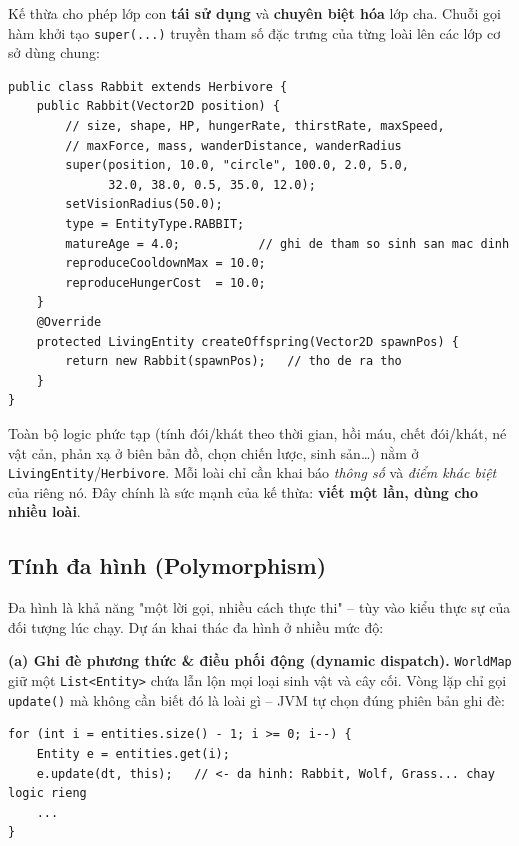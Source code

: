 \documentclass[12pt,a4paper]{report}
\newcommand{\keyword}[1]{\textcolor{primaryblue}{\textbf{#1}}}
\newcommand{\code}[1]{\texttt{\small #1}}
\begin{document}
Kế thừa cho phép lớp con \keyword{tái sử dụng} và \keyword{chuyên biệt hóa} lớp cha. Chuỗi gọi hàm khởi tạo \code{super(...)} truyền tham số đặc trưng của từng loài lên các lớp cơ sở dùng chung:

\begin{lstlisting}[caption={Lớp Rabbit -- chỉ vài dòng nhờ kế thừa toàn bộ logic sinh tồn}]
public class Rabbit extends Herbivore {
    public Rabbit(Vector2D position) {
        // size, shape, HP, hungerRate, thirstRate, maxSpeed,
        // maxForce, mass, wanderDistance, wanderRadius
        super(position, 10.0, "circle", 100.0, 2.0, 5.0,
              32.0, 38.0, 0.5, 35.0, 12.0);
        setVisionRadius(50.0);
        type = EntityType.RABBIT;
        matureAge = 4.0;           // ghi de tham so sinh san mac dinh
        reproduceCooldownMax = 10.0;
        reproduceHungerCost  = 10.0;
    }
    @Override
    protected LivingEntity createOffspring(Vector2D spawnPos) {
        return new Rabbit(spawnPos);   // tho de ra tho
    }
}
\end{lstlisting}

Toàn bộ logic phức tạp (tính đói/khát theo thời gian, hồi máu, chết đói/khát, né vật cản, phản xạ ở biên bản đồ, chọn chiến lược, sinh sản\dots) nằm ở \code{LivingEntity}/\code{Herbivore}. Mỗi loài chỉ cần khai báo \textit{thông số} và \textit{điểm khác biệt} của riêng nó. Đây chính là sức mạnh của kế thừa: \keyword{viết một lần, dùng cho nhiều loài}.

\subsection{Tính đa hình (Polymorphism)}

Đa hình là khả năng "một lời gọi, nhiều cách thực thi" -- tùy vào kiểu thực sự của đối tượng lúc chạy. Dự án khai thác đa hình ở nhiều mức độ:

\textbf{(a) Ghi đè phương thức \& điều phối động (dynamic dispatch).} \code{WorldMap} giữ một \code{List<Entity>} chứa lẫn lộn mọi loại sinh vật và cây cối. Vòng lặp chỉ gọi \code{update()} mà không cần biết đó là loài gì -- JVM tự chọn đúng phiên bản ghi đè:

\begin{lstlisting}[caption={Đa hình tại vòng lặp cập nhật của WorldMap}]
for (int i = entities.size() - 1; i >= 0; i--) {
    Entity e = entities.get(i);
    e.update(dt, this);   // <- da hinh: Rabbit, Wolf, Grass... chay logic rieng
    ...
}
\end{lstlisting}
\end{document}
